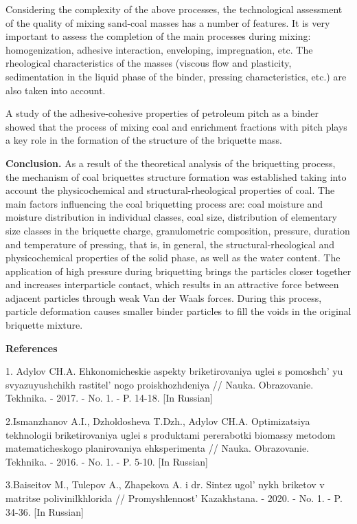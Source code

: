 Considering the complexity of the above processes, the technological
assessment of the quality of mixing sand-coal masses has a number of
features. It is very important to assess the completion of the main
processes during mixing: homogenization, adhesive interaction,
enveloping, impregnation, etc. The rheological characteristics of the
masses (viscous flow and plasticity, sedimentation in the liquid phase
of the binder, pressing characteristics, etc.) are also taken into
account.

A study of the adhesive-cohesive properties of petroleum pitch as a
binder showed that the process of mixing coal and enrichment fractions
with pitch plays a key role in the formation of the structure of the
briquette mass.

{\bfseries Conclusion.} As a result of the theoretical analysis of the
briquetting process, the mechanism of coal briquettes structure
formation was established taking into account the physicochemical and
structural-rheological properties of coal. The main factors influencing
the coal briquetting process are: coal moisture and moisture
distribution in individual classes, coal size, distribution of
elementary size classes in the briquette charge, granulometric
composition, pressure, duration and temperature of pressing, that is, in
general, the structural-rheological and physicochemical properties of
the solid phase, as well as the water content. The application of high
pressure during briquetting brings the particles closer together and
increases interparticle contact, which results in an attractive force
between adjacent particles through weak Van der Waals forces. During
this process, particle deformation causes smaller binder particles to
fill the voids in the original briquette mixture.

{\bfseries References}

1. Adylov CH.A. Ehkonomicheskie aspekty briketirovaniya uglei s
pomoshch' yu svyazuyushchikh
rastitel' nogo proiskhozhdeniya // Nauka. Obrazovanie.
Tekhnika. - 2017. - No. 1. - P. 14-18. {[}In Russian{]}

2.Ismanzhanov A.I., Dzholdosheva T.Dzh., Adylov CH.A. Optimizatsiya
tekhnologii briketirovaniya uglei s produktami pererabotki biomassy
metodom matematicheskogo planirovaniya ehksperimenta // Nauka.
Obrazovanie. Tekhnika. - 2016. - No. 1. - P. 5-10. {[}In Russian{]}

3.Baiseitov M., Tulepov A., Zhapekova A. i dr. Sintez
ugol' nykh briketov v matritse polivinilkhlorida //
Promyshlennost'{} Kazakhstana. - 2020. - No. 1. - P.
34-36. {[}In Russian{]}

